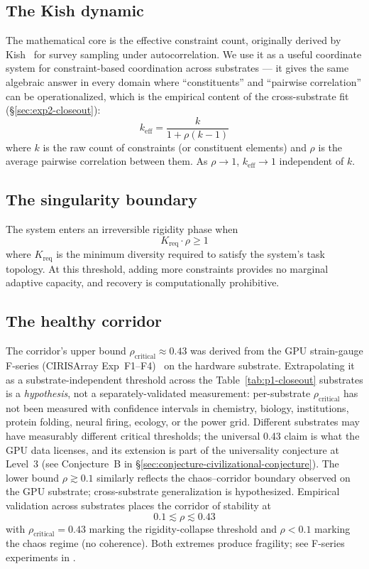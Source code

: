 \documentclass[11pt,a4paper]{article}
\begin{document}
\subsection{The Kish dynamic}
The mathematical core is the effective constraint count, originally derived by Kish~\cite{kish1965} for survey sampling under autocorrelation. We use it as a useful coordinate system for constraint-based coordination across substrates --- it gives the same algebraic answer in every domain where ``constituents'' and ``pairwise correlation'' can be operationalized, which is the empirical content of the cross-substrate fit (\S\ref{sec:exp2-closeout}):
\begin{equation}
k_{\text{eff}} = \frac{k}{1 + \rho(k - 1)}
\label{eq:kish}
\end{equation}
where $k$ is the raw count of constraints (or constituent elements) and $\rho$ is the average pairwise correlation between them. As $\rho \to 1$, $k_{\text{eff}} \to 1$ independent of $k$.

\subsection{The singularity boundary}
The system enters an irreversible rigidity phase when
\begin{equation}
K_{\text{req}} \cdot \rho \ge 1
\label{eq:singularity}
\end{equation}
where $K_{\text{req}}$ is the minimum diversity required to satisfy the system's task topology. At this threshold, adding more constraints provides no marginal adaptive capacity, and recovery is computationally prohibitive.

\subsection{The healthy corridor}
\label{sec:corridor}

The corridor's upper bound $\rho_{\text{critical}} \approx 0.43$ was derived from the GPU strain-gauge F-series (CIRISArray Exp~F1--F4)~\cite{cirisarray_repo} on the hardware substrate. Extrapolating it as a substrate-independent threshold across the Table~\ref{tab:p1-closeout} substrates is a \emph{hypothesis}, not a separately-validated measurement: per-substrate $\rho_{\text{critical}}$ has not been measured with confidence intervals in chemistry, biology, institutions, protein folding, neural firing, ecology, or the power grid. Different substrates may have measurably different critical thresholds; the universal 0.43 claim is what the GPU data licenses, and its extension is part of the universality conjecture at Level~3 (see Conjecture~B in \S\ref{sec:conjecture-civilizational-conjecture}). The lower bound $\rho \gtrsim 0.1$ similarly reflects the chaos--corridor boundary observed on the GPU substrate; cross-substrate generalization is hypothesized.
Empirical validation across substrates places the corridor of stability at
\[
0.1 \lesssim \rho \lesssim 0.43
\]
with $\rho_{\text{critical}} = 0.43$ marking the rigidity-collapse threshold and $\rho < 0.1$ marking the chaos regime (no coherence). Both extremes produce fragility; see F-series experiments in \cite{moore_cca_2026}.
\end{document}
